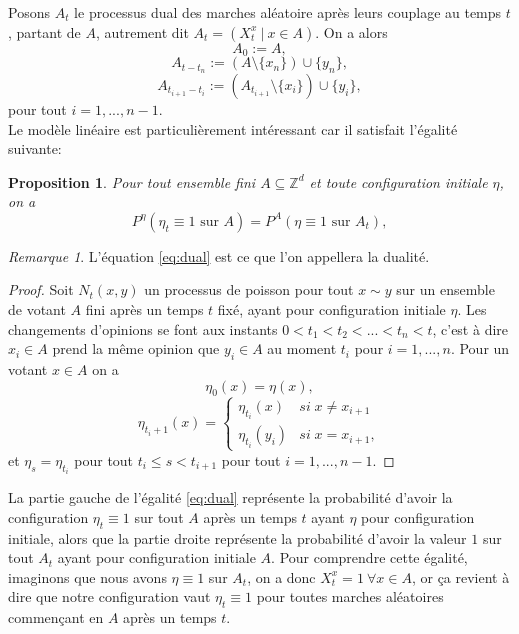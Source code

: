 \documentclass[a4paper,11pt]{article}
\theoremstyle{break}
\theoremstyle{break}
\newtheorem{proposition}[theorem]{Proposition}
\theoremstyle{definition}
\theoremstyle{remark}
\newtheorem{remarque}[theorem]{Remarque}
\begin{document}
Posons $A_t$ le processus dual des marches aléatoire après leurs couplage au temps $t$, partant de $A$, autrement dit $A_t={(X^x_t \ \vert \ x\in A)}$. On a alors
$$
A_0 :=A, 
$$
$$
A_{t-t_n}:=(A\setminus \{ x_n \} ) \cup \{ y_n \},
$$
$$
A_{t_{i+1}-t_i}:=(A_{t_{i+1}}\setminus \{ x_i \} ) \cup \{ y_i \},
$$
pour tout $i=1,...,n-1$.\\

Le modèle linéaire est particulièrement intéressant car il satisfait l'égalité suivante:

\begin{proposition}
Pour tout ensemble fini $A\subseteq\mathbb{Z}^d$ et toute configuration initiale $\eta$, on a
\begin{equation} \label{eq:dual}
P^\eta (\eta_t \equiv 1 \text{ sur } A) = P^A (\eta \equiv 1 \text{ sur } A_t),
\end{equation}
\end{proposition}

\begin{remarque}
L'équation \eqref{eq:dual} est ce que l'on appellera la dualité.
\end{remarque}

\begin{proof}
Soit $N_t(x,y)$ un processus de poisson pour tout $x\sim y$ sur un ensemble de votant $A$ fini après un temps $t$ fixé, ayant pour configuration initiale $\eta$. Les changements d'opinions se font aux instants $0< t_1< t_2<...<t_n<t$, c'est à dire $x_i\in A$ prend la même opinion que $y_i\in A$ au moment $t_i$ pour $i=1,...,n$. Pour un votant $x\in A$ on a
$$
\eta_0 (x) = \eta(x),
$$
$$
\eta_{t_i+1} (x) = \left\{\begin{array}{ll}
\eta_{t_i} (x) & si\; x\neq x_{i+1}\\
\eta_{t_i} (y_i)&si\; x=x_{i+1},
\end{array}\right.
$$
et $\eta_s=\eta_{t_i}$ pour tout $t_i\leqslant s<t_{i+1}$ pour tout $i=1,..., n-1$.
\end{proof}

La partie gauche de l'égalité \eqref{eq:dual} représente la probabilité d'avoir la configuration $\eta_t \equiv 1$ sur tout $A$ après un temps $t$ ayant $\eta$ pour configuration initiale, alors que la partie droite représente  la probabilité d'avoir la valeur $1$ sur tout $A_t$ ayant pour configuration initiale $A$. Pour comprendre cette égalité, imaginons que nous avons $\eta \equiv 1$ sur $A_t$, on a donc $X^x_t=1 \ \forall x\in A$, or ça revient à dire que notre configuration vaut $\eta_t \equiv 1$ pour toutes marches aléatoires commençant en $A$ après un temps $t$.
\end{document}
